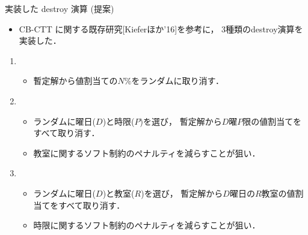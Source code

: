 \documentclass[11pt,dvipdfmx,handout]{beamer}
\begin{document}
\begin{frame}{実装した destroy 演算 (提案)}
  \begin{itemize}
  \item CB-CTT に関する既存研究[Kieferほか'16]を参考に，
    3種類のdestroy演算を実装した．
  \end{itemize}

  \begin{block}{}
    \begin{enumerate}
    \item {}
      \begin{itemize}
      \item 暫定解から値割当ての$N$\%をランダムに取り消す．
      \end{itemize}
    \item {}
      \begin{itemize}
      \item ランダムに曜日($D$)と時限($P$)を選び，
        暫定解から$D$曜$P$限の値割当てをすべて取り消す．
      \item 教室に関するソフト制約のペナルティを減らすことが狙い．
   \end{itemize}
  \item {}
   \begin{itemize}
   \item ランダムに曜日($D$)と教室($R$)を選び，
     暫定解から$D$曜日の$R$教室の値割当てをすべて取り消す．
   \item 時限に関するソフト制約のペナルティを減らすことが狙い．
   \end{itemize}
  \end{enumerate}
  \end{block}
 \end{frame}
\end{document}
